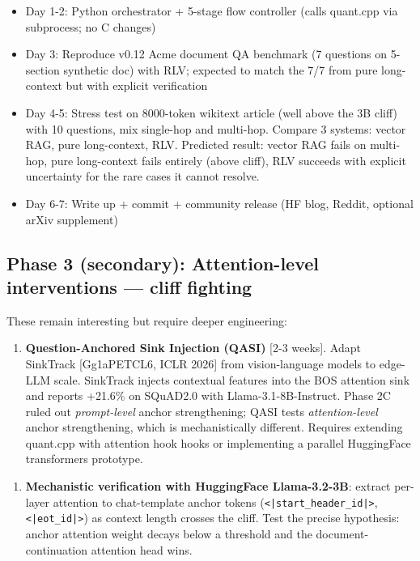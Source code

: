 \documentclass[11pt]{article}
\begin{document}
\begin{itemize}
\item Day 1-2: Python orchestrator + 5-stage flow controller (calls quant.cpp via subprocess; no C changes)
\item Day 3: Reproduce v0.12 Acme document QA benchmark (7 questions on 5-section synthetic doc) with RLV; expected to match the 7/7 from pure long-context but with explicit verification
\item Day 4-5: Stress test on 8000-token wikitext article (well above the 3B cliff) with 10 questions, mix single-hop and multi-hop. Compare 3 systems: vector RAG, pure long-context, RLV. Predicted result: vector RAG fails on multi-hop, pure long-context fails entirely (above cliff), RLV succeeds with explicit uncertainty for the rare cases it cannot resolve.
\item Day 6-7: Write up + commit + community release (HF blog, Reddit, optional arXiv supplement)
\end{itemize}


\subsection*{Phase 3 (secondary): Attention-level interventions — cliff fighting}


These remain interesting but require deeper engineering:


\begin{enumerate}
\item \textbf{Question-Anchored Sink Injection (QASI)} [2-3 weeks]. Adapt SinkTrack [Gg1aPETCL6, ICLR 2026] from vision-language models to edge-LLM scale. SinkTrack injects contextual features into the BOS attention sink and reports +21.6\% on SQuAD2.0 with Llama-3.1-8B-Instruct. Phase 2C ruled out \textit{prompt-level} anchor strengthening; QASI tests \textit{attention-level} anchor strengthening, which is mechanistically different. Requires extending quant.cpp with attention hook hooks or implementing a parallel HuggingFace transformers prototype.
\end{enumerate}


\begin{enumerate}
\item \textbf{Mechanistic verification with HuggingFace Llama-3.2-3B}: extract per-layer attention to chat-template anchor tokens (\texttt{<|start\_header\_id|>}, \texttt{<|eot\_id|>}) as context length crosses the cliff. Test the precise hypothesis: anchor attention weight decays below a threshold and the document-continuation attention head wins.
\end{enumerate}
\end{document}
